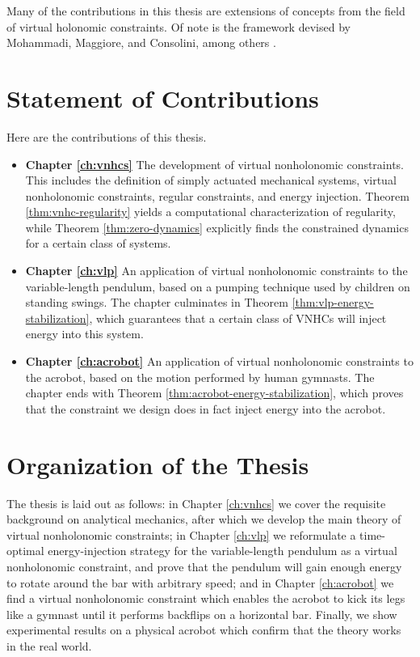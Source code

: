 Many of the contributions in this thesis are extensions of concepts from the
field of virtual holonomic constraints. 
Of note is the framework devised by Mohammadi, Maggiore, and
Consolini, among others
\cite{vhcs_for_el_systems,dynamic_vhcs_stabilize_closed_orbits,lagrangian_structure_reduced_dynamics_vhcs,xingbo_thesis}.

\section{Statement of Contributions}
Here are the contributions of this thesis.
\begin{itemize}[label={}]
   \item \textbf{Chapter \ref{ch:vnhcs}} The development of 
      virtual nonholonomic constraints.
      This includes the definition of simply actuated mechanical systems, virtual
      nonholonomic constraints, regular constraints, and energy injection.
      Theorem \ref{thm:vnhc-regularity} yields a computational characterization
      of regularity, while Theorem \ref{thm:zero-dynamics} explicitly finds the
      constrained dynamics for a certain class of systems.
   \item \textbf{Chapter \ref{ch:vlp}} An application of virtual nonholonomic
      constraints to the variable-length pendulum, based on a pumping technique
      used by children on standing swings.
      The chapter culminates in Theorem \ref{thm:vlp-energy-stabilization},
      which guarantees that a certain class of VNHCs will inject energy into
      this system.
   \item \textbf{Chapter \ref{ch:acrobot}} An application of virtual
      nonholonomic constraints to the acrobot, based on the motion performed by
      human gymnasts.
      The chapter ends with Theorem \ref{thm:acrobot-energy-stabilization},
      which proves that the constraint we design does in fact inject energy into
      the acrobot.
\end{itemize}

\section{Organization of the Thesis}
The thesis is laid out as follows: 
in Chapter \ref{ch:vnhcs} we cover the requisite background on analytical 
mechanics, after which we develop the main theory of virtual nonholonomic
constraints;
in Chapter \ref{ch:vlp} we reformulate a time-optimal energy-injection strategy
for the variable-length pendulum as a virtual nonholonomic constraint, and
prove that the pendulum will gain enough energy to rotate around the bar with
arbitrary speed;
and in Chapter \ref{ch:acrobot} we find a virtual nonholonomic constraint 
which enables the acrobot to kick its legs like a gymnast until it
performs backflips on a horizontal bar.
Finally, we show experimental results on a physical acrobot which confirm
that the theory works in the real world.

